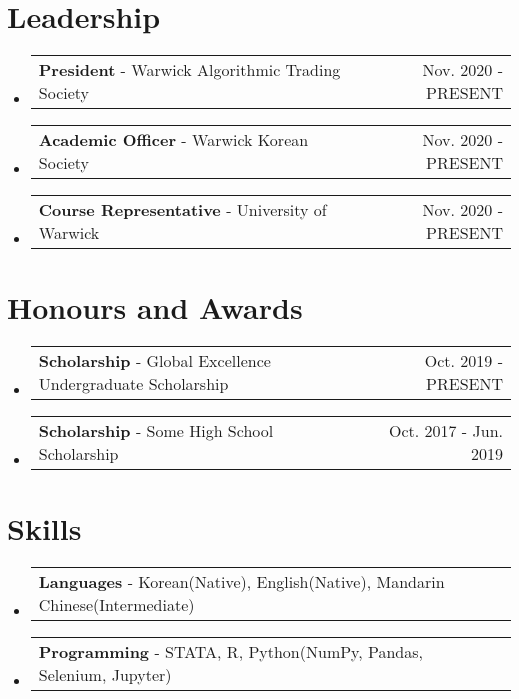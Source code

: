 \documentclass[letterpaper,11pt]{article}
\makeatletter
\newcommand{\resumeLeadership}[2]{
  \item
    \begin{tabular*}{0.97\textwidth}[t]{l@{\extracolsep{\fill}}r}
      #1 & #2
    \end{tabular*}
}
\newcommand{\resumeSubHeadingListStart}{\begin{itemize}[leftmargin=*]}
\newcommand{\resumeSubHeadingListEnd}{\end{itemize}}
\makeatother
\begin{document}

\section{Leadership}
  \resumeSubHeadingListStart
    \resumeLeadership{\textbf{President} - Warwick Algorithmic Trading Society}{Nov. 2020 - PRESENT}
    \resumeLeadership{\textbf{Academic Officer} - Warwick Korean Society}{Nov. 2020 - PRESENT}
    \resumeLeadership{\textbf{Course Representative} - University of Warwick}{Nov. 2020 - PRESENT}
  \resumeSubHeadingListEnd

\section{Honours and Awards}
  \resumeSubHeadingListStart
    \resumeLeadership{\textbf{Scholarship} - Global Excellence Undergraduate Scholarship}{Oct. 2019 - PRESENT }
    \resumeLeadership{\textbf{Scholarship} - Some High School Scholarship}{Oct. 2017 - Jun. 2019}
  \resumeSubHeadingListEnd
  
\section{Skills}
  \resumeSubHeadingListStart
    \resumeLeadership{\textbf{Languages} - Korean(Native), English(Native), Mandarin Chinese(Intermediate)}{ }
    \resumeLeadership{\textbf{Programming} - STATA, R, Python(NumPy, Pandas, Selenium, Jupyter)}{ }
  \resumeSubHeadingListEnd
\end{document}
